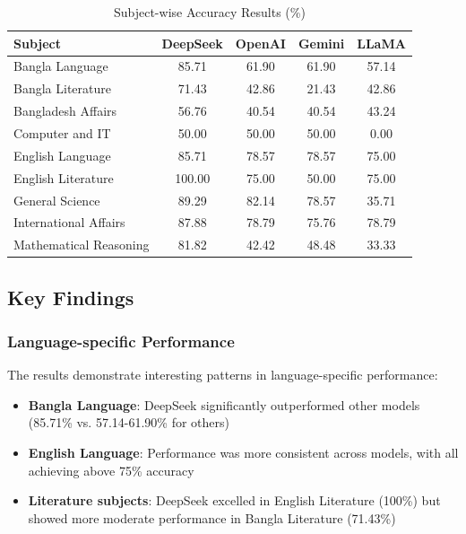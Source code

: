 \documentclass[11pt,a4paper]{article}
\begin{document}
\begin{table}[H]
\centering
\caption{Subject-wise Accuracy Results (\%)}
\label{tab:subject_results}
\begin{tabular}{lcccc}
\toprule
\textbf{Subject} & \textbf{DeepSeek} & \textbf{OpenAI} & \textbf{Gemini} & \textbf{LLaMA} \\
\midrule
Bangla Language & 85.71 & 61.90 & 61.90 & 57.14 \\
Bangla Literature & 71.43 & 42.86 & 21.43 & 42.86 \\
Bangladesh Affairs & 56.76 & 40.54 & 40.54 & 43.24 \\
Computer and IT & 50.00 & 50.00 & 50.00 & 0.00 \\
English Language & 85.71 & 78.57 & 78.57 & 75.00 \\
English Literature & 100.00 & 75.00 & 50.00 & 75.00 \\
General Science & 89.29 & 82.14 & 78.57 & 35.71 \\
International Affairs & 87.88 & 78.79 & 75.76 & 78.79 \\
Mathematical Reasoning & 81.82 & 42.42 & 48.48 & 33.33 \\
\bottomrule
\end{tabular}
\end{table}

\subsection{Key Findings}

\subsubsection{Language-specific Performance}

The results demonstrate interesting patterns in language-specific performance:

\begin{itemize}
    \item \textbf{Bangla Language}: DeepSeek significantly outperformed other models (85.71\% vs. 57.14-61.90\% for others)
    \item \textbf{English Language}: Performance was more consistent across models, with all achieving above 75\% accuracy
    \item \textbf{Literature subjects}: DeepSeek excelled in English Literature (100\%) but showed more moderate performance in Bangla Literature (71.43\%)
\end{itemize}
\end{document}
